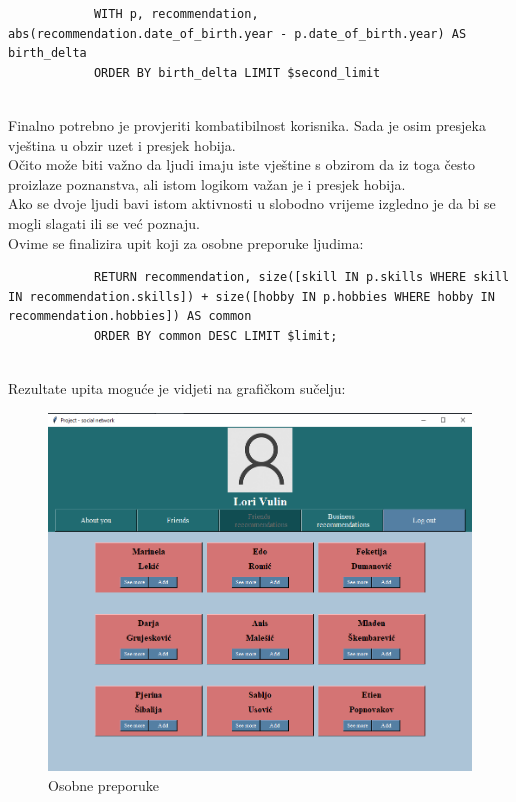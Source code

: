 \documentclass[titlepage, 12pt]{scrartcl}
\begin{document}
	\begin{samepage}
		\begin{verbatim}
			WITH p, recommendation, abs(recommendation.date_of_birth.year - p.date_of_birth.year) AS birth_delta 
			ORDER BY birth_delta LIMIT $second_limit
			
		\end{verbatim}
	\end{samepage}
	\newpage
	\begin{samepage}
	Finalno potrebno je provjeriti kombatibilnost korisnika. Sada je osim presjeka vještina u obzir uzet i presjek hobija. \\
	Očito može biti važno da ljudi imaju iste vještine s obzirom da iz toga često proizlaze poznanstva, ali istom logikom važan je i presjek hobija. \\
	Ako se dvoje ljudi bavi istom aktivnosti u slobodno vrijeme izgledno je da bi se mogli slagati ili se već poznaju. \\
	
	Ovime se finalizira upit koji za osobne preporuke ljudima:
		\begin{verbatim}
			RETURN recommendation, size([skill IN p.skills WHERE skill IN recommendation.skills]) + size([hobby IN p.hobbies WHERE hobby IN recommendation.hobbies]) AS common 
			ORDER BY common DESC LIMIT $limit;
			
		\end{verbatim}
	\end{samepage}
	\begin{samepage}
		Rezultate upita moguće je vidjeti na grafičkom sučelju:
		\begin{figure}[h]
			\centering
			\includegraphics[scale=0.4]{slike/personal.jpg}
			\caption{Osobne preporuke}
			\label{fig:personal_rec}
		\end{figure}
	\end{samepage}
	
\end{document}
